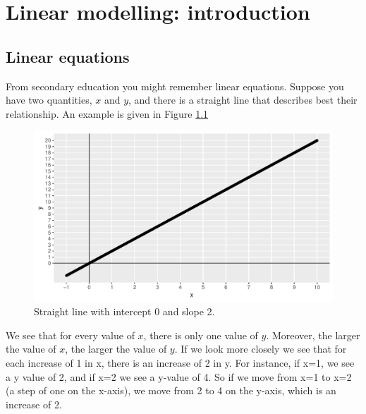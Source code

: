 \documentclass[]{report}\usepackage[]{graphicx}\usepackage[]{color}
\makeatletter
\def\maxwidth{ %
  \ifdim\Gin@nat@width>\linewidth
    \linewidth
  \else
    \Gin@nat@width
  \fi
}
\newenvironment{knitrout}{}{} %
\makeatother
\begin{document}
% 

\chapter{Linear modelling: introduction}\label{chap:simple}


\section{Linear equations}

From secondary education you might remember linear equations. Suppose you have two quantities, $x$ and $y$, and there is a straight line that describes best their relationship. An example is given in Figure \ref{fig:lm_1}

\begin{knitrout}
\color{fgcolor}\begin{figure}

{\centering \includegraphics[width=\maxwidth]{figure/lm_1-1} 

}

\caption[Straight line with intercept 0 and slope 2]{Straight line with intercept 0 and slope 2.}\label{fig:lm_1}
\end{figure}


\end{knitrout}

We see that for every value of $x$, there is only one value of $y$. Moreover, the larger the value of $x$, the larger the value of $y$. If we look more closely we see that for each increase of 1 in x, there is an increase of 2 in y. For instance, if x=1, we see a y value of 2, and if x=2 we see a y-value of 4. So if we move from x=1 to x=2 (a step of one on the x-axis), we move from 2 to 4 on the y-axis, which is an increase of 2.
\end{document}
